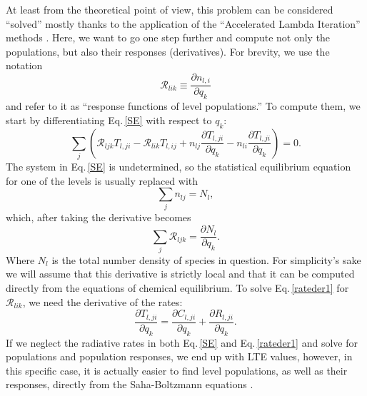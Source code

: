 \documentclass[referee]{aa}
\begin{document}
At least from the theoretical point of view, this problem can be considered ``solved'' mostly thanks to the application of the ``Accelerated Lambda Iteration'' methods \citep[for an insightful review see][]{Hubeny03}.  Here, we want to go one step further and compute not only the populations, but also their responses (derivatives). For brevity, we use the notation
\begin{equation}
 {\mathcal R}_{lik} \equiv \frac{\partial n_{l,i}}{\partial q_k}
\end{equation}
and refer to it as ``response functions of level populations.'' To compute them, we start by differentiating Eq.\,\ref{SE} with respect to $q_k$:
\begin{equation}
 \sum_j \left ({\mathcal R}_{ljk} T_{l,ji} - {\mathcal R}_{lik} T_{l,ij} + n_{lj} \frac{\partial T_{l,ji}}{\partial q_k} - n_{li} \frac{\partial T_{l,ji}}{\partial q_k} \right ) = 0.
 \label{rateder1}
\end{equation}
The system in Eq.\,\ref{SE} is undetermined, so the statistical equilibrium equation for one of the levels is usually replaced with
\begin{equation}
 \sum_j n_{lj} = N_l,
\end{equation}
which, after taking the derivative becomes
\begin{equation}
 \sum_j {\mathcal R}_{ljk} = \frac{\partial N_l}{\partial q_k}.
\end{equation}
Where $N_l$ is the total number density of species in question. For  simplicity's sake we will assume that this derivative is strictly local and that it can be computed directly from the equations of chemical equilibrium. To solve Eq.\,\ref{rateder1} for $\mathcal{R}_{lik}$, we need the derivative of the rates:
\begin{equation}
\frac{\partial T_{l,ji}}{\partial q_k} = \frac{\partial C_{l,ji}}{\partial q_k} + \frac{\partial R_{l,ji}}{\partial q_k}.
\label{rateder2}
\end{equation}
If we neglect the radiative rates  in both Eq.\,\ref{SE} and Eq.\,\ref{rateder1} and solve for populations and population responses, we end up with LTE values, however, in this specific case, it is actually easier to find level populations, as well as their responses, directly from the Saha-Boltzmann equations \citep[see, e.g.,][]{SIR}. 
\end{document}
